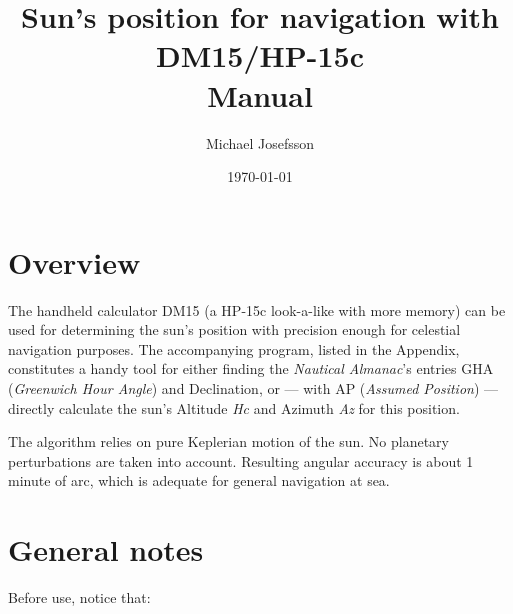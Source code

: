 \documentclass[english,a4paper,onepage, 10pt]{scrbook}
\begin{document}
\newcommand{\tavla}[1]{\reversemarginpar{ \rule[-10mm]{0.1mm}{#1cm}}}
\newcommand{\svarsrad}{\begin{flushright} \rule{7cm}{0.2mm} \end{flushright}}
\newcommand{\asm}[1]{\texttt{\textbf{#1}}}

\newcommand{\startex}[1]{\textbf{Example}\begin{quote}#1\end{quote}}
\newcommand{\slutex}{\begin{flushright}\rule{1ex}{1ex}\end{flushright}}


\title{Sun's position for navigation with DM15/HP-15c\\{}Manual\\{}}

\author{Michael Josefsson}
\date{\today}
\maketitle
\tableofcontents

\addtolength{\evensidemargin}{-2.0cm}
\addtolength{\oddsidemargin}{2.0cm}
\setcounter{chapter}{1}

\newpage
\section{Overview}

The handheld calculator DM15 (a HP-15c look-a-like with more memory) can be used for determining the sun's position with precision enough for celestial navigation purposes. The accompanying program, listed in the Appendix, constitutes a handy tool for either finding the \emph{Nautical Almanac}'s entries GHA (\emph{Greenwich Hour Angle}) and Declination, or --- with AP (\emph{Assumed Position}) --- directly calculate the sun's Altitude \emph{Hc} and Azimuth \emph{Az} for this position.

The algorithm relies on pure Keplerian motion of the sun. No planetary perturbations are taken into account. Resulting angular accuracy is about 1 minute of arc, which is adequate for general navigation at sea.

\section{General notes} 

Before use, notice that: 
\end{document}
